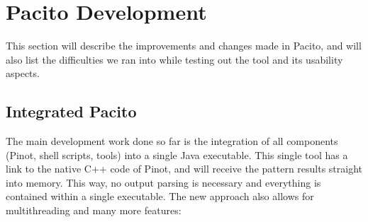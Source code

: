 \section{Pacito Development}
This section will describe the improvements and changes made in Pacito, and will also list the difficulties we ran into while testing out the tool and its usability aspects.

\subsection{Integrated Pacito}
The main development work done so far is the integration of all components (Pinot, shell scripts, tools) into a single Java executable. This single tool has a link to the native C++ code of Pinot, and will receive the pattern results straight into memory. This way, no output parsing is necessary and everything is contained within a single executable. The new approach also allows for multithreading and many more features:
